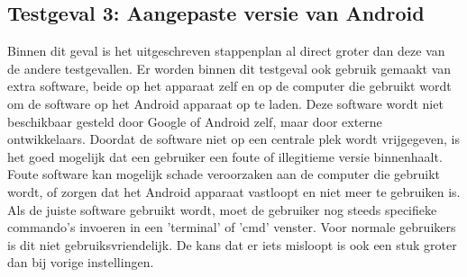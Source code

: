 \subsection{Testgeval 3: Aangepaste versie van Android}
Binnen dit geval is het uitgeschreven stappenplan al direct groter dan deze van de andere testgevallen. Er worden binnen dit testgeval ook gebruik gemaakt van extra software, beide op het apparaat zelf en op de computer die gebruikt wordt om de software op het Android apparaat op te laden. Deze software wordt niet beschikbaar gesteld door Google of Android zelf, maar door externe ontwikkelaars. Doordat de software niet op een centrale plek wordt vrijgegeven, is het goed mogelijk dat een gebruiker een foute of illegitieme versie binnenhaalt. Foute software kan mogelijk schade veroorzaken aan de computer die gebruikt wordt, of zorgen dat het Android apparaat vastloopt en niet meer te gebruiken is. Als de juiste software gebruikt wordt, moet de gebruiker nog steeds specifieke commando's invoeren in een 'terminal' of 'cmd' venster. Voor normale gebruikers is dit niet gebruiksvriendelijk. De kans dat er iets misloopt is ook een stuk groter dan bij vorige instellingen.